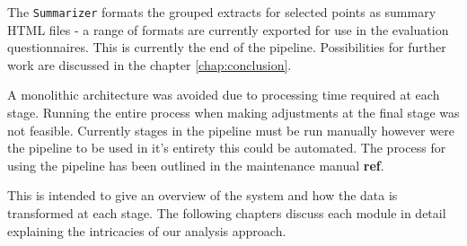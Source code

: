   The \texttt{Summarizer} formats the grouped extracts for selected points as summary HTML files - a range of formats are currently exported for use in the evaluation questionnaires. This is currently the end of the pipeline. Possibilities for further work are discussed in the chapter \ref{chap:conclusion}.

  A monolithic architecture was avoided due to processing time required at each stage. Running the entire process when making adjustments at the final stage was not feasible. Currently stages in the pipeline must be run manually however were the pipeline to be used in it's entirety this could be automated. The process for using the pipeline has been outlined in the maintenance manual \textbf{ref}.

  This is intended to give an overview of the system and how the data is transformed at each stage. The following chapters discuss each module in detail explaining the intricacies of our analysis approach.
